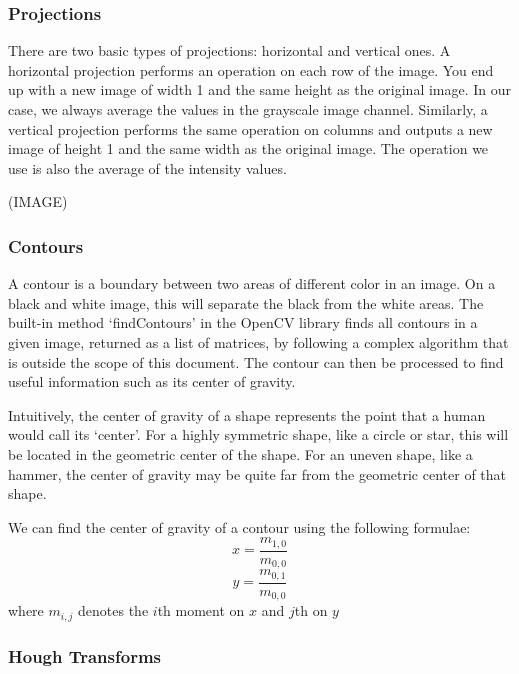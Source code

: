 \subsubsection{Projections}

There are two basic types of projections: horizontal and vertical ones. A horizontal projection performs an operation on each row of the image. You end up with a new image of width 1 and the same height as the original image. In our case, we always average the values in the grayscale image channel.
Similarly, a vertical projection performs the same operation on columns and outputs a new image of height 1 and the same width as the original image. The operation we use is also the average of the intensity values.

(IMAGE)

\subsubsection{Contours}

A contour is a boundary between two areas of different color in an image. On a black and white image, this will separate the black from the white areas. The built-in method ‘findContours’ in the OpenCV library finds all contours in a given image, returned as a list of matrices, by following a complex algorithm that is outside the scope of this document. The contour can then be processed to find useful information such as its center of gravity.

Intuitively, the center of gravity of a shape represents the point that a human would call its ‘center’. For a highly symmetric shape, like a circle or star, this will be located in the geometric center of the shape. For an uneven shape, like a hammer, the center of gravity may be quite far from the geometric center of that shape.

We can find the center of gravity of a contour using the following formulae:
\begin{equation}
    x = \frac{ m_{1,0}}{m_{0,0}}
\end{equation}
\begin{equation}
    y = \frac{m_{0,1}}{m_{0,0}}
\end{equation}
where $m_{i,j}$ denotes the $i$th moment on $x$ and $j$th on $y$



\subsubsection{Hough Transforms}


